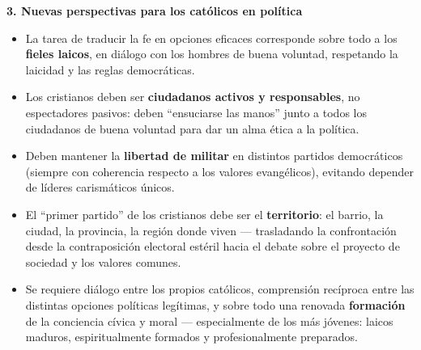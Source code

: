 \documentclass[10pt,a4paper]{article}
\begin{document}
\begin{itemize}
\end{itemize}

\medskip\noindent \textbf{3. Nuevas perspectivas para los católicos en política}\par\nopagebreak
\begin{itemize}
\item La tarea de traducir la fe en opciones eficaces corresponde sobre todo a los \textbf{fieles laicos}, en diálogo con los hombres de buena voluntad, respetando la laicidad y las reglas democráticas.
\item Los cristianos deben ser \textbf{ciudadanos activos y responsables}, no espectadores pasivos: deben ``ensuciarse las manos'' junto a todos los ciudadanos de buena voluntad para dar un alma ética a la política.
\item Deben mantener la \textbf{libertad de militar} en distintos partidos democráticos (siempre con coherencia respecto a los valores evangélicos), evitando depender de líderes carismáticos únicos.
\item El ``primer partido'' de los cristianos debe ser el \textbf{territorio}: el barrio, la ciudad, la provincia, la región donde viven --- trasladando la confrontación desde la contraposición electoral estéril hacia el debate sobre el proyecto de sociedad y los valores comunes.
\item Se requiere diálogo entre los propios católicos, comprensión recíproca entre las distintas opciones políticas legítimas, y sobre todo una renovada \textbf{formación} de la conciencia cívica y moral --- especialmente de los más jóvenes: laicos maduros, espiritualmente formados y profesionalmente preparados.
\end{itemize}
\end{document}
